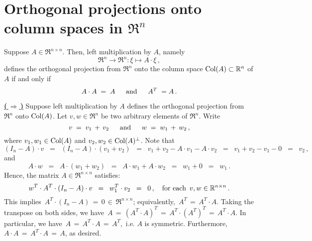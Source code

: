 

\section{Orthogonal projections onto column spaces in $\Re^{n}$}
\setcounter{theorem}{0}
\setcounter{equation}{0}

\renewcommand{\theenumi}{\roman{enumi}}
\renewcommand{\labelenumi}{\textnormal{(\theenumi)}$\;\;$}


\begin{proposition}
\mbox{}\vskip 0.1cm\noindent
Suppose $A \in \Re^{n \times n}$.
Then, left multiplication by $A$, namely
\begin{equation*}
\Re^{n} \longrightarrow \Re^{n} : \xi \longmapsto A\cdot\xi\,,
\end{equation*}
defines the orthogonal projection from $\Re^{n}$ onto the column space
$\Col(A) \subset \Re^{n}$ of $A$
if and only if
\begin{equation*}
A \cdot A \; = \; A
\quad\;\;\textnormal{and}\quad\;\;
A^{T} \; = A\,.
\end{equation*}
\end{proposition}
\proof
\vskip 0.1cm
\noindent
\underline{\textbf{(\,$\Longrightarrow$\,)}}\quad
Suppose left multiplication by $A$ defines the orthogonal projection
from $\Re^{n}$ onto $\Col(A)$.
Let $v, w \in \Re^{n}$ be two arbitrary elements of $\Re^{n}$.
Write
\begin{equation*}
v \;=\; v_{1} \,+\, v_{2}
\quad\;\;\textnormal{and}\quad\;\;
w \;=\; w_{1} \,+\, w_{2}\,,
\end{equation*}
where $v_{1}, w_{1} \in \Col(A)$ and $v_{2}, w_{2} \in \Col(A)^{\perp}$.
Note that
\begin{equation*}
(I_{n} - A) \cdot v
\;\;=\;\;
	(I_{n} - A) \cdot (v_{1} + v_{2})
\;\;=\;\;
	v_{1} + v_{2} - A \cdot v_{1} - A \cdot v_{2}
\;\;=\;\;
	v_{1} + v_{2} - v_{1} - 0
\;\;=\;\;
	v_{2}\,,
\end{equation*}
and
\begin{equation*}
A\cdot w
\;\;=\;\;
	A\cdot(w_{1} + w_{2})
\;\;=\;\;
	A \cdot w_{1} + A \cdot w_{2}
\;\;=\;\;
	w_{1} + 0
\;\;=\;\;
	w_{1}\,.
\end{equation*}
Hence, the matrix $A \in \Re^{n \times n}$ satisfies:
\begin{equation*}
w^{T} \cdot A^{T} \cdot (I_{n} - A) \cdot v
\;\;=\;\;
	w_{1}^{T} \cdot v_{2}
\;\;=\;\;
	0\,,
\quad\textnormal{for each \,$v, w \in \Re^{n \times n}$}\,.
\end{equation*}
This implies \,$A^{T} \cdot (I_{n} - A) \,=\, 0 \,\in\, \Re^{n \times n}$;
equivalently, \,$A^{T} \,=\, A^{T} \cdot A$.
Taking the transpose on both sides, we have
\,$A \,=\, (A^{T} \cdot A)^{T} \,=\, A^{T} \cdot (A^{T})^{T} \,=\, A^{T} \cdot A$.
In particular, we have \,$A \,=\, A^{T} \cdot A \,=\, A^{T}$,\, i.e. $A$ is symmetric.
Furthermore, $A \cdot A \,=\, A^{T} \cdot A \,=\, A$, as desired.

